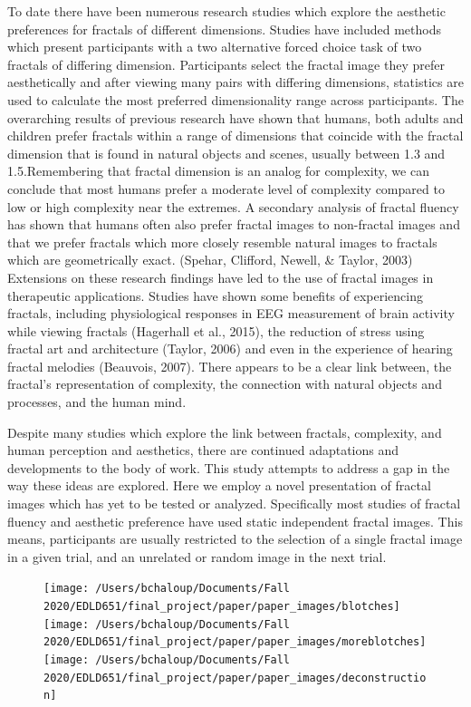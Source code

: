 \documentclass[english,jou]{apa6}
\begin{document}
To date there have been numerous research studies which explore the aesthetic preferences for fractals of different dimensions. Studies have included methods which present participants with a two alternative forced choice task of two fractals of differing dimension. Participants select the fractal image they prefer aesthetically and after viewing many pairs with differing dimensions, statistics are used to calculate the most preferred dimensionality range across participants. The overarching results of previous research have shown that humans, both adults and children prefer fractals within a range of dimensions that coincide with the fractal dimension that is found in natural objects and scenes, usually between 1.3 and 1.5.Remembering that fractal dimension is an analog for complexity, we can conclude that most humans prefer a moderate level of complexity compared to low or high complexity near the extremes. A secondary analysis of fractal fluency has shown that humans often also prefer fractal images to non-fractal images and that we prefer fractals which more closely resemble natural images to fractals which are geometrically exact. (Spehar, Clifford, Newell, \& Taylor, 2003) Extensions on these research findings have led to the use of fractal images in therapeutic applications. Studies have shown some benefits of experiencing fractals, including physiological responses in EEG measurement of brain activity while viewing fractals (Hagerhall et al., 2015), the reduction of stress using fractal art and architecture (Taylor, 2006) and even in the experience of hearing fractal melodies (Beauvois, 2007). There appears to be a clear link between, the fractal's representation of complexity, the connection with natural objects and processes, and the human mind.

Despite many studies which explore the link between fractals, complexity, and human perception and aesthetics, there are continued adaptations and developments to the body of work. This study attempts to address a gap in the way these ideas are explored. Here we employ a novel presentation of fractal images which has yet to be tested or analyzed. Specifically most studies of fractal fluency and aesthetic preference have used static independent fractal images. This means, participants are usually restricted to the selection of a single fractal image in a given trial, and an unrelated or random image in the next trial.

\begin{figure}

{\centering \texttt{[image: /Users/bchaloup/Documents/Fall 2020/EDLD651/final\_project/paper/paper\_images/blotches]} \texttt{[image: /Users/bchaloup/Documents/Fall 2020/EDLD651/final\_project/paper/paper\_images/moreblotches]} \texttt{[image: /Users/bchaloup/Documents/Fall 2020/EDLD651/final\_project/paper/paper\_images/deconstruction]} 

}

\caption{ }\label{fig:unnamed-chunk-5}
\end{figure}
\end{document}
